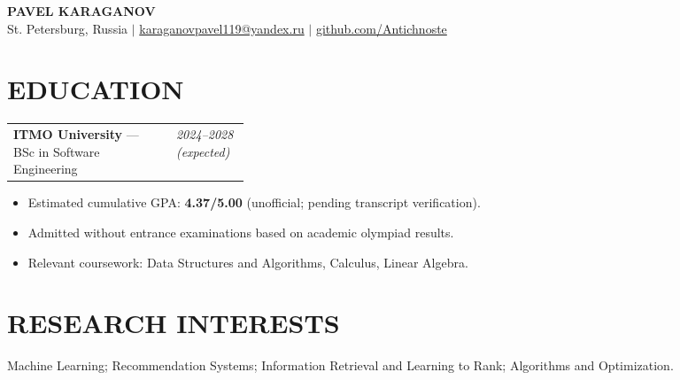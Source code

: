 \documentclass[10pt,a4paper]{article}
\begin{document}
\color{ink}
\begin{center}
{\LARGE\bfseries PAVEL KARAGANOV}\\[4pt]
{\small St. Petersburg, Russia \quad $\vert$ \quad
\href{mailto:karaganovpavel119@yandex.ru}{karaganovpavel119@yandex.ru} \quad $\vert$ \quad
\href{https://github.com/Antichnoste}{github.com/Antichnoste}}
\end{center}
\vspace{-3pt}

\section*{EDUCATION}
\begin{tabularx}{\linewidth}{@{}X>{\raggedleft\arraybackslash}p{0.31\linewidth}@{}}
\textbf{ITMO University} --- BSc in Software Engineering & \textit{2024--2028 (expected)}\\
\end{tabularx}
\begin{itemize}
  \item Estimated cumulative GPA: \textbf{4.37/5.00} (unofficial; pending transcript verification).
  \item Admitted without entrance examinations based on academic olympiad results.
  \item Relevant coursework: Data Structures and Algorithms, Calculus, Linear Algebra.
\end{itemize}

\section*{RESEARCH INTERESTS}
Machine Learning; Recommendation Systems; Information Retrieval and Learning to Rank; Algorithms and Optimization.
\end{document}
